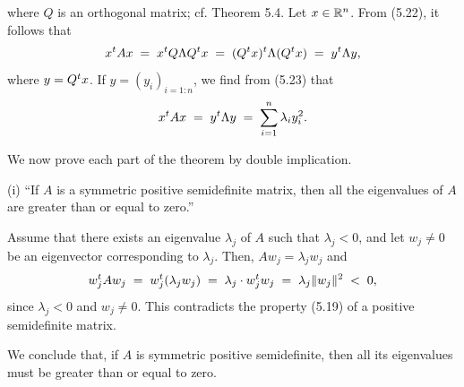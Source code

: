 %

where $Q$ is an orthogonal matrix; cf. Theorem 5.4. Let $x \in \mathbb{R}^n$. From (5.22), it
follows that
\begin{equation}
x^{t} Ax \;=\; x^{t} Q\Lambda Q^{t} x \;=\; (Q^{t} x)^{t} \Lambda (Q^{t} x) \;=\; y^{t}
\Lambda y,
\end{equation}
where $y = Q^{t} x$. If $y = (y_i)_{i=1:n}$, we find from (5.23) that
\begin{equation}
x^{t} Ax \;=\; y^{t} \Lambda y \;=\; \sum_{i=1}^{n} \lambda_i y_i^2.
\end{equation}

We now prove each part of the theorem by double implication.

(i) ``If $A$ is a symmetric positive semidefinite matrix, then all the eigenvalues of
$A$ are greater than or equal to zero.''

Assume that there exists an eigenvalue $\lambda_j$ of $A$ such that $\lambda_j < 0$,
and let $w_j \neq 0$ be an eigenvector corresponding to $\lambda_j$. Then,
$Aw_j = \lambda_jw_j$ and
\[
w_j^{t} Aw_j \;=\; w_j^{t}(\lambda_jw_j) \;=\; \lambda_j \cdot w_j^{t} w_j \;=\;
\lambda_j\|w_j\|^2 \;<\; 0,
\]
since $\lambda_j < 0$ and $w_j \neq 0$. This contradicts the property (5.19) of a
positive semidefinite matrix.

We conclude that, if $A$ is symmetric positive semidefinite, then all its eigenvalues
must be greater than or equal to zero.

